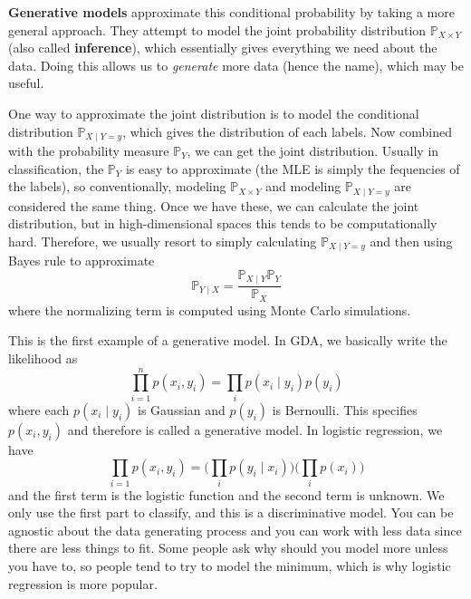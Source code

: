 \documentclass{article}
\begin{document}
      \begin{definition}
        \textbf{Generative models} approximate this conditional probability by taking a more general approach. They attempt to model the joint probability distribution $\mathbb{P}_{X \times Y}$ (also called \textbf{inference}), which essentially gives everything we need about the data. Doing this allows us to \textit{generate} more data (hence the name), which may be useful. 
            
        One way to approximate the joint distribution is to model the conditional distribution $\mathbb{P}_{X \mid Y = y}$, which gives the distribution of each labels. Now combined with the probability measure $\mathbb{P}_Y$, we can get the joint distribution. Usually in classification, the $\mathbb{P}_Y$ is easy to approximate (the MLE is simply the fequencies of the labels), so conventionally, modeling $\mathbb{P}_{X \times Y}$ and modeling $\mathbb{P}_{X \mid Y = y}$ are considered the same thing. Once we have these, we can calculate the joint distribution, but in high-dimensional spaces this tends to be computationally hard. Therefore, we usually resort to simply calculating $\mathbb{P}_{X \mid Y = y}$ and then using Bayes rule to approximate 
        \begin{equation}
          \mathbb{P}_{Y \mid X} = \frac{\mathbb{P}_{X \mid Y} \mathbb{P}_Y}{\mathbb{P}_X}
        \end{equation}
        where the normalizing term is computed using Monte Carlo simulations. 
      \end{definition}

      This is the first example of a generative model. In GDA, we basically write the likelihood as 
      \begin{equation}
        \prod_{i=1}^n p(x_i, y_i) = \prod_{i} p(x_i \mid y_i) p(y_i)
      \end{equation}
      where each $p(x_i \mid y_i)$ is Gaussian and $p(y_i)$ is Bernoulli. This specifies $p(x_i, y_i)$ and therefore is called a generative model. In logistic regression, we have 
      \begin{equation}
        \prod_{i=1} p(x_i, y_i) = \bigg( \prod_i p(y_i \mid x_i) \bigg) \bigg( \prod_i p(x_i) \bigg)
      \end{equation}
      and the first term is the logistic function and the second term is unknown. We only use the first part to classify, and this is a discriminative model. You can be agnostic about the data generating process and you can work with less data since there are less things to fit. Some people ask why should you model more unless you have to, so people tend to try to model the minimum, which is why logistic regression is more popular. 
\end{document}
